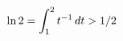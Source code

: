 \documentclass[preview]{standalone}
\begin{document}
\begin{align*}
\special{dvisvgm:raw <g id='unique000'>}\ln2=\int_1^2t^{-1}\,dt>1/2\special{dvisvgm:raw </g>}
\end{align*}
\end{document}
